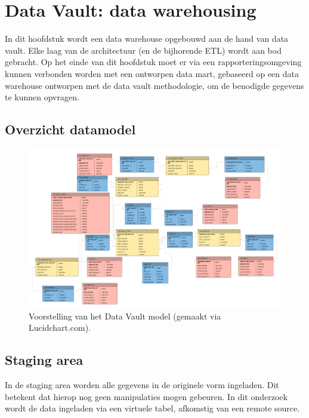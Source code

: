 
\chapter{Data Vault: data warehousing}
\label{ch:dvmodel}
In dit hoofdstuk wordt een data warehouse opgebouwd aan de hand van data vault. Elke laag van de architectuur (en de bijhorende ETL) wordt aan bod gebracht. Op het einde van dit hoofdstuk moet er via een rapporteringsomgeving kunnen verbonden worden met een ontworpen data mart, gebaseerd op een data warehouse ontworpen met de data vault methodologie, om de benodigde gegevens te kunnen opvragen.

\newpage
\section{Overzicht datamodel}
\begin{figure}[h]
	\centering
	\includegraphics[scale=0.34]{../images/DataVaultModel.png}
	\caption{Voorstelling van het Data Vault model (gemaakt via Lucidchart.com).}
	\label{fig:dvm}
\end{figure}

\section{Staging area}
\label{sec:stagareadv}
In de staging area worden alle gegevens in de originele vorm ingeladen. Dit betekent dat hierop nog geen manipulaties mogen gebeuren. In dit onderzoek wordt de data ingeladen via een virtuele tabel, afkomstig van een remote source.

